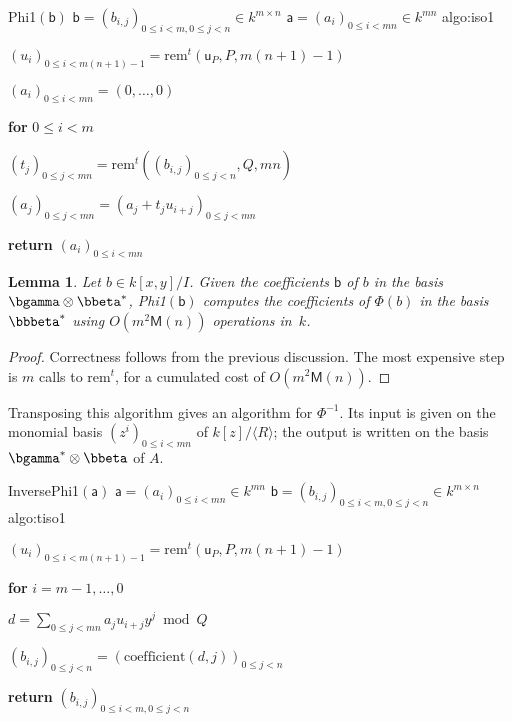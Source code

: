 \documentclass{sig-alternate}
\def\M {\ensuremath{\mathsf{M}}}
\def\va {\ensuremath{\mathsf{a}}}
\def\vu {\ensuremath{\mathsf{u}}}
\def\vb {\ensuremath{\mathsf{b}}}
\def\rem {\ensuremath{\mathrm{rem}}}
\def\coeff {\ensuremath{\mathrm{coefficient}}}
\newcounter{algo}
\newenvironment{algorithm_endline}[4]{\small\begin{center}\begin{minipage}{0.48\textwidth}
      \refstepcounter{algo}
      \label{#4}
      \sf
      \rule{\textwidth}{0.2pt}\\
      \makebox[\textwidth][c]{Algorithm~\arabic{algo}:~\textbf{#1}}\\
      \rule[0.5\baselineskip]{\textwidth}{0.2pt}\\

      \vspace{-12pt}

      \parbox{\textwidth}{\textbf{Input} #2}
      \parbox{\textwidth}{\textbf{Output} #3}

\vspace{-7pt}

      \begin{enumerate*}}{\end{enumerate*}
      \vspace{-11pt}
      \rule{\textwidth}{0.2pt}
\end{minipage}\end{center}
}
\newcommand{\ang}[1]{\langle#1\rangle}
\newtheorem{Lemma}{Lemma}
\begin{document}
\vspace{-10pt}

\begin{algorithm_endline}
{Phi1$(\vb)$}
{$\vb = (b_{i,j})_{0 \le i < m, 0 \le j < n} \in k^{m \times n}$}
{$\va = (a_{i})_{0 \le i < mn} \in k^{m n}$}
{algo:iso1}
\item $(u_i)_{0\le i < m(n+1)-1} = \rem^t(\vu_P,P,m(n+1)-1)$
\item  $(a_i)_{0\le i < mn} = (0,\dots,0)$
\item {\bf for} {$0\le i < m$}
\item \hspace{7mm} $(t_j)_{0\le j < mn} = \rem^t( (b_{i,j})_{0 \le j <n},Q,mn)$
\item \hspace{7mm} $(a_j)_{0\le j < mn} = (a_j + t_ju_{i+j})_{0\le j < mn}$
\item {\bf return} $(a_i)_{0\le i <mn}$
\end{algorithm_endline}

\begin{Lemma}
  Let $b \in k[x,y]/I$. Given the coefficients $\vb$ of $b$ in the
  basis $\bgamma \otimes \bbeta^\ast$, {\sf Phi1}$(\vb)$ computes the
  coefficients of $\Phi(b)$ in the basis $\bbbeta^\ast$ using
  $O(m^2\M(n))$ operations in~$k$.
\end{Lemma}
\begin{proof}
  Correctness follows from the previous discussion. The most expensive
  step is $m$ calls to $\rem^t$, for a cumulated cost of
  $O(m^2\M(n))$.
\end{proof}

Transposing this algorithm gives an algorithm for $\Phi^{-1}$. Its
input is given on the monomial basis $(z^i)_{0 \le i < mn}$ of
$k[z]/\ang{R}$; the output is written on the basis $\bgamma^\ast
\otimes \bbeta$ of $A$.

\begin{algorithm_endline}
{InversePhi1$(\va)$}
{$\va = (a_{i})_{0 \le i < mn} \in k^{m n}$}
{$\vb = (b_{i,j})_{0 \le i < m, 0 \le j < n} \in k^{m \times n}$}
{algo:tiso1}
\item $(u_i)_{0\le i < m(n+1)-1} = \rem^t(\vu_P,P,m(n+1)-1)$
\item {\bf for} {$i = m-1,\dots,0$}
\item \hspace{7mm} $d=\sum_{0 \le j < mn} a_j u_{i+j} y^j \bmod Q$
\item \hspace{7mm}  $(b_{i,j})_{0 \le j < n} = (\coeff(d,j))_{0 \le j < n}$
\item {\bf return} $(b_{i,j})_{0 \le i < m, 0 \le j < n}$
\end{algorithm_endline}
\end{document}
